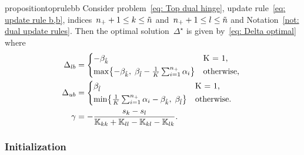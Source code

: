 \pagebreak

\begin{restatable}{proposition}{toprulebb}\label{prop: toppushk family hinge update b,b}
  Consider problem~\eqref{eq: Top dual hinge}, update rule~\eqref{eq: update rule b,b}, indices~$n_{+} + 1 \leq k \leq \tilde{n}$ and~$n_{+} + 1 \leq l \leq \tilde{n}$ and Notation~\ref{not: dual update rules}. Then the optimal solution~$\Delta^{\star}$ is given by~\eqref{eq: Delta optimal} where
  \begin{align*}
    \Delta_{lb} & = 
      \begin{cases*}
        - \betak & K = 1, \\
        \max \Brac[c]{- \betak,\; \betal - \frac{1}{K} \sum_{i = 1}^{\npos} \alpha_i} & \textrm{otherwise},
      \end{cases*} \\
    \Delta_{ub} & = 
      \begin{cases*}
        \betal & K = 1, \\
        \min \Brac[c]{\frac{1}{K} \sum_{i = 1}^{\npos} \alpha_i - \betak,\; \betal} & \textrm{otherwise}.
      \end{cases*} \\
    \gamma & = -\frac{s_k - s_l}{\K_{kk} + \K_{ll} - \K_{kl} - \K_{lk}}.
  \end{align*}
\end{restatable}

\subsubsection{Initialization}

